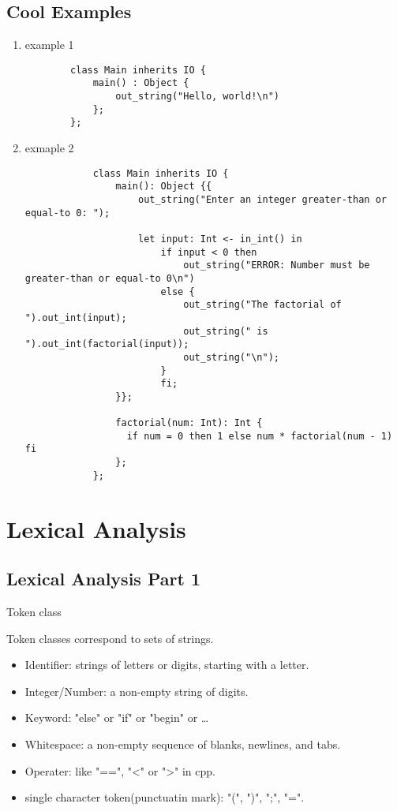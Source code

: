\documentclass[11pt]{report}
\begin{document}
    \section{Cool Examples}
    \begin{enumerate}
        \item example 1
        \begin{lstlisting}
        class Main inherits IO {
            main() : Object {
                out_string("Hello, world!\n")
            };
        };
        \end{lstlisting}
        \item  exmaple 2
        \begin{lstlisting}
            class Main inherits IO {
                main(): Object {{
                    out_string("Enter an integer greater-than or equal-to 0: ");
              
                    let input: Int <- in_int() in
                        if input < 0 then
                            out_string("ERROR: Number must be greater-than or equal-to 0\n")
                        else {
                            out_string("The factorial of ").out_int(input);
                            out_string(" is ").out_int(factorial(input));
                            out_string("\n");
                        }
                        fi;
                }};
              
                factorial(num: Int): Int {
                  if num = 0 then 1 else num * factorial(num - 1) fi
                };
            };
        \end{lstlisting}
    \end{enumerate}    

    \newpage
    \chapter{Lexical Analysis}
    \section{Lexical Analysis Part 1}
    \textcolor{stanfordred}{Token class}

    Token classes correspond to sets of strings.

    \begin{itemize}
        \item \textcolor{stanfordred}{Identifier}: strings of letters or digits, starting with a letter.
        \item \textcolor{stanfordred}{Integer/Number}: a non-empty string of digits.
        \item \textcolor{stanfordred}{Keyword}: "else" or "if" or "begin" or \dots
        \item \textcolor{stanfordred}{Whitespace}: a non-empty sequence of blanks, newlines, and tabs.
        \item \textcolor{stanfordred}{Operater}: like "==", "<" or ">" in cpp.
        \item \textcolor{stanfordred}{single character token(punctuatin mark)}: "(", ")", ";", "=".
    \end{itemize}
\end{document}
